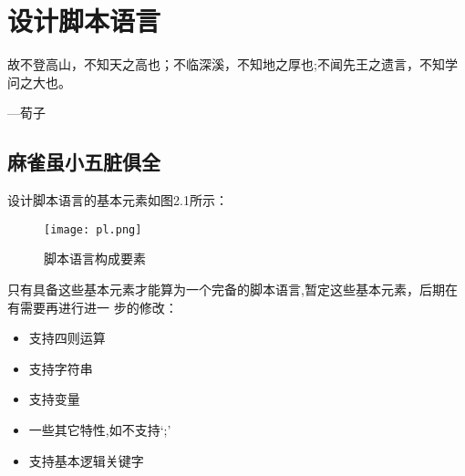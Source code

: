 \chapter{设计脚本语言}

\begin{flushleft}
故不登高山，不知天之高也；不临深溪，不知地之厚也;不闻先王之遗言，不知学问之大也。
\end{flushleft}

\begin{flushright}
---荀子   
\end{flushright}

\section{麻雀虽小五脏俱全}

设计脚本语言的基本元素如图2.1所示：

\begin{figure}[hbtp]
\centering
\texttt{[image: pl.png]}
\caption{脚本语言构成要素}
\end{figure}

只有具备这些基本元素才能算为一个完备的脚本语言,暂定这些基本元素，后期在有需要再进行进一
步的修改：
\begin{itemize}
	\item 支持四则运算
	\item 支持字符串
	\item 支持变量
	\item 一些其它特性,如不支持‘;’
	\item 支持基本逻辑关键字
\end{itemize}

